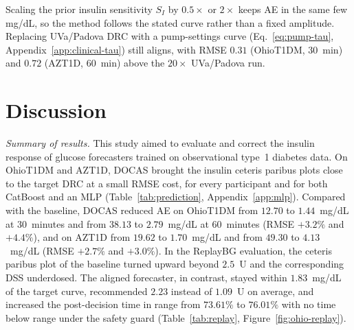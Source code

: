 \documentclass[a4paper,fleqn]{cas-sc}
\begin{document}
Scaling the prior insulin
sensitivity $S_I$ by $0.5\times$ or $2\times$ keeps AE in the same few mg/dL,
so the method follows the stated curve rather than a fixed amplitude. Replacing
UVa/Padova DRC with a pump-settings curve
(Eq.~\ref{eq:pump-tau}, Appendix~\ref{app:clinical-tau}) still aligns, with RMSE
$0.31$ (OhioT1DM, 30~min) and $0.72$ (AZT1D, 60~min) above the $20\times$
UVa/Padova run.



\section{Discussion}\label{sec:discussion}
\textit{Summary of results.}
This study aimed to evaluate and correct the insulin response of glucose forecasters trained on observational type~1 diabetes data. On OhioT1DM and AZT1D, DOCAS brought the insulin ceteris paribus plots close to the target DRC at a small RMSE cost, for every participant and for both CatBoost and an MLP (Table~\ref{tab:prediction}, Appendix~\ref{app:mlp}). Compared with the baseline, DOCAS reduced AE on OhioT1DM from $12.70$ to $1.44$~mg/dL at 30~minutes and from $38.13$ to $2.79$~mg/dL at 60~minutes (RMSE $+3.2\%$ and $+4.4\%$), and on AZT1D from $19.62$ to $1.70$~mg/dL and from $49.30$ to $4.13$~mg/dL (RMSE $+2.7\%$ and $+3.0\%$). In the ReplayBG evaluation, the ceteris paribus plot of the baseline turned upward beyond $2.5$~U and the corresponding DSS underdosed. The aligned forecaster, in contrast, stayed within $1.83$~mg/dL of the target curve, recommended $2.23$ instead of $1.09$~U on average, and increased the post-decision time in range from $73.61\%$ to $76.01\%$ with no time below range under the safety guard (Table~\ref{tab:replay}, Figure~\ref{fig:ohio-replay}).
\end{document}
